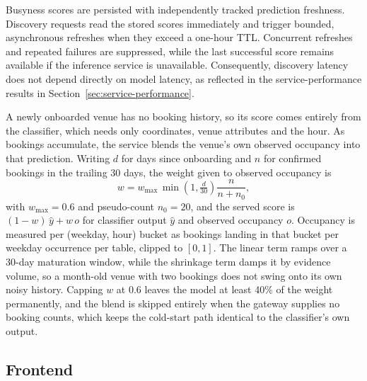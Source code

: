 \documentclass[conference]{IEEEtran}
\begin{document}
Busyness scores are persisted with independently tracked prediction freshness.
Discovery requests read the stored scores immediately and trigger bounded,
asynchronous refreshes when they exceed a one-hour TTL. Concurrent refreshes
and repeated failures are suppressed, while the last successful score remains
available if the inference service is unavailable. Consequently, discovery
latency does not depend directly on model latency, as reflected in the
service-performance results in Section~\ref{sec:service-performance}.

A newly onboarded venue has no booking history, so its score comes entirely
from the classifier, which needs only coordinates, venue attributes and the
hour. As bookings accumulate, the service blends the venue's own observed
occupancy into that prediction. Writing $d$ for days since onboarding and $n$
for confirmed bookings in the trailing 30 days, the weight given to observed
occupancy is
\begin{equation}
w = w_{\max}\,\min\!\left(1,\tfrac{d}{30}\right)\frac{n}{n + n_0},
\end{equation}
with $w_{\max} = 0.6$ and pseudo-count $n_0 = 20$, and the served score is
$(1-w)\,\hat{y} + w\,o$ for classifier output $\hat{y}$ and observed occupancy
$o$. Occupancy is measured per (weekday, hour) bucket as bookings landing in
that bucket per weekday occurrence per table, clipped to $[0,1]$. The linear
term ramps over a 30-day maturation window, while the shrinkage term damps it
by evidence volume, so a month-old venue with two bookings does not swing onto
its own noisy history. Capping $w$ at 0.6 leaves the model at least 40\% of the
weight permanently, and the blend is skipped entirely when the gateway supplies
no booking counts, which keeps the cold-start path identical to the
classifier's own output.

\subsection{Frontend}
\end{document}
